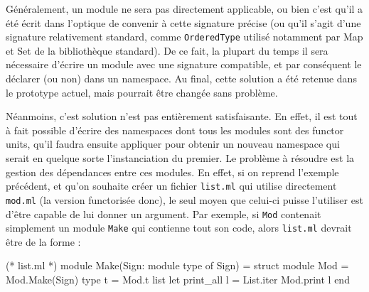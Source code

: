 \documentclass[11pt,a4paper]{report}
\begin{document}
Généralement, un module ne sera pas directement applicable, ou bien c'est qu'il
a été écrit dans l'optique de convenir à cette signature précise (ou qu'il
s'agit d'une signature relativement standard, comme \texttt{OrderedType} utilisé
notamment par Map et Set de la bibliothèque standard). De ce fait, la plupart du
temps il sera nécessaire d'écrire un module avec une signature compatible, et
par conséquent le déclarer (ou non) dans un namespace. Au final, cette solution
a été retenue dans le prototype actuel, mais pourrait être changée sans
problème.

\medskip

Néanmoins, c'est solution n'est pas entièrement satisfaisante. En effet, il est
tout à fait possible d'écrire des namespaces dont tous les modules sont des
functor units, qu'il faudra ensuite appliquer pour obtenir un nouveau namespace
qui serait en quelque sorte l'instanciation du premier. Le problème à résoudre
est la gestion des dépendances entre ces modules. En effet, si on reprend
l'exemple précédent, et qu'on souhaite créer un fichier \texttt{list.ml} qui
utilise directement \texttt{mod.ml} (la version functorisée donc), le seul moyen
que celui-ci puisse l'utiliser est d'être capable de lui donner un argument. Par
exemple, si \texttt{Mod} contenait simplement un module \texttt{Make} qui
contienne tout son code, alors \texttt{list.ml} devrait être de la forme :
\begin{OCaml}
(* list.ml *)
module Make(Sign: module type of Sign) =
  struct
    module Mod = Mod.Make(Sign)
    type t = Mod.t list
    let print_all l = List.iter Mod.print l
  end
\end{OCaml}
\end{document}
